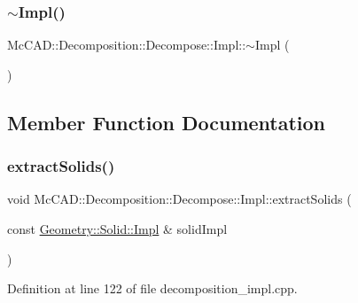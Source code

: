 \subsubsection{\texorpdfstring{$\sim$\+Impl()}{~Impl()}\hspace{0.1cm}{\footnotesize\ttfamily [2/2]}}
{\footnotesize\ttfamily Mc\+C\+A\+D\+::\+Decomposition\+::\+Decompose\+::\+Impl\+::$\sim$\+Impl (\begin{DoxyParamCaption}{ }\end{DoxyParamCaption})}



\subsection{Member Function Documentation}
\mbox{\label{classMcCAD_1_1Decomposition_1_1Decompose_1_1Impl_a72d35db075f7a695c1bf3f99ccf8d8a8}} 
\subsubsection{\texorpdfstring{extract\+Solids()}{extractSolids()}\hspace{0.1cm}{\footnotesize\ttfamily [1/2]}}
{\footnotesize\ttfamily void Mc\+C\+A\+D\+::\+Decomposition\+::\+Decompose\+::\+Impl\+::extract\+Solids (\begin{DoxyParamCaption}\item[{const \hyperlink{classMcCAD_1_1Geometry_1_1Solid_1_1Impl}{Geometry\+::\+Solid\+::\+Impl} \&}]{solid\+Impl }\end{DoxyParamCaption})}



Definition at line 122 of file decomposition\+\_\+impl.\+cpp.


